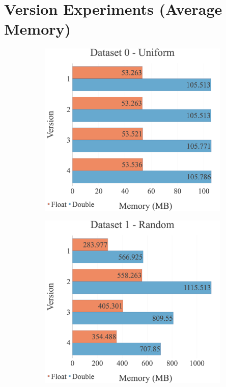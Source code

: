\section{Version Experiments (Average Memory)}
\label{appendix:option:versionsmemory}
\begin{figure}[H]
\begin{adjustwidth}{-2cm}{-2cm}
\centering
\begin{subfigure}{.62\textwidth}
    \centering
    \includegraphics[width=1\textwidth]{img/experiments/mem-option-versions-0_UNIFORM.png}
\end{subfigure}
\begin{subfigure}{.62\textwidth}
    \centering
    \includegraphics[width=1\textwidth]{img/experiments/mem-option-versions-1_RAND.png}

\end{subfigure}
\end{adjustwidth}
\end{figure}

